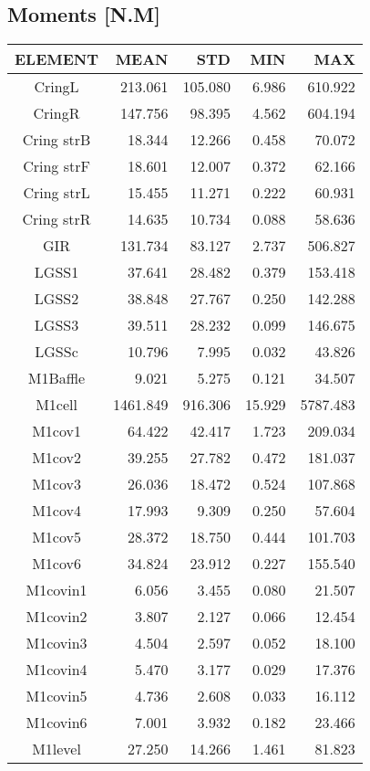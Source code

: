 \subsection{Moments [N.M]}
\begin{longtable}{crrrr}\toprule
 ELEMENT & MEAN & STD & MIN & MAX \\\hline
 CringL & 213.061 & 105.080 & 6.986 & 610.922 \\
 CringR & 147.756 & 98.395 & 4.562 & 604.194 \\
 Cring strB & 18.344 & 12.266 & 0.458 & 70.072 \\
 Cring strF & 18.601 & 12.007 & 0.372 & 62.166 \\
 Cring strL & 15.455 & 11.271 & 0.222 & 60.931 \\
 Cring strR & 14.635 & 10.734 & 0.088 & 58.636 \\
 GIR & 131.734 & 83.127 & 2.737 & 506.827 \\
 LGSS1 & 37.641 & 28.482 & 0.379 & 153.418 \\
 LGSS2 & 38.848 & 27.767 & 0.250 & 142.288 \\
 LGSS3 & 39.511 & 28.232 & 0.099 & 146.675 \\
 LGSSc & 10.796 & 7.995 & 0.032 & 43.826 \\
 M1Baffle & 9.021 & 5.275 & 0.121 & 34.507 \\
 M1cell & 1461.849 & 916.306 & 15.929 & 5787.483 \\
 M1cov1 & 64.422 & 42.417 & 1.723 & 209.034 \\
 M1cov2 & 39.255 & 27.782 & 0.472 & 181.037 \\
 M1cov3 & 26.036 & 18.472 & 0.524 & 107.868 \\
 M1cov4 & 17.993 & 9.309 & 0.250 & 57.604 \\
 M1cov5 & 28.372 & 18.750 & 0.444 & 101.703 \\
 M1cov6 & 34.824 & 23.912 & 0.227 & 155.540 \\
 M1covin1 & 6.056 & 3.455 & 0.080 & 21.507 \\
 M1covin2 & 3.807 & 2.127 & 0.066 & 12.454 \\
 M1covin3 & 4.504 & 2.597 & 0.052 & 18.100 \\
 M1covin4 & 5.470 & 3.177 & 0.029 & 17.376 \\
 M1covin5 & 4.736 & 2.608 & 0.033 & 16.112 \\
 M1covin6 & 7.001 & 3.932 & 0.182 & 23.466 \\
 M1level & 27.250 & 14.266 & 1.461 & 81.823 \\

\end{longtable}
